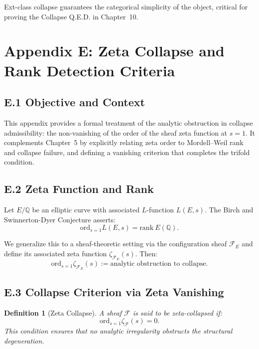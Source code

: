 \documentclass[11pt]{article}
\newtheorem{definition}[theorem]{Definition}
\begin{document}
Ext-class collapse guarantees the categorical simplicity of the object, critical for proving the Collapse Q.E.D. in Chapter~10.



\appendix
\section*{Appendix E: Zeta Collapse and Rank Detection Criteria}

\subsection*{E.1 Objective and Context}

This appendix provides a formal treatment of the analytic obstruction in collapse admissibility: the non-vanishing of the order of the sheaf zeta function at \( s = 1 \). It complements Chapter~5 by explicitly relating zeta order to Mordell–Weil rank and collapse failure, and defining a vanishing criterion that completes the trifold condition.

\subsection*{E.2 Zeta Function and Rank}

Let \( E/\mathbb{Q} \) be an elliptic curve with associated \( L \)-function \( L(E,s) \). The Birch and Swinnerton-Dyer Conjecture asserts:
\[
\mathrm{ord}_{s=1} L(E, s) = \mathrm{rank}~E(\mathbb{Q}).
\]

We generalize this to a sheaf-theoretic setting via the configuration sheaf \( \mathcal{F}_E \) and define its associated zeta function \( \zeta_{\mathcal{F}_E}(s) \). Then:
\[
\mathrm{ord}_{s=1} \zeta_{\mathcal{F}_E}(s) := \text{analytic obstruction to collapse}.
\]

\subsection*{E.3 Collapse Criterion via Zeta Vanishing}

\begin{definition}[Zeta Collapse]
A sheaf \( \mathcal{F} \) is said to be \emph{zeta-collapsed} if:
\[
\mathrm{ord}_{s=1} \zeta_{\mathcal{F}}(s) = 0.
\]
This condition ensures that no analytic irregularity obstructs the structural degeneration.
\end{definition}
\end{document}

